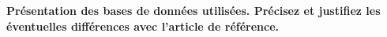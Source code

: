\textbf{Présentation des bases de données utilisées. Précisez et justifiez les éventuelles différences avec l’article de référence.}\\

\lipsum[3]